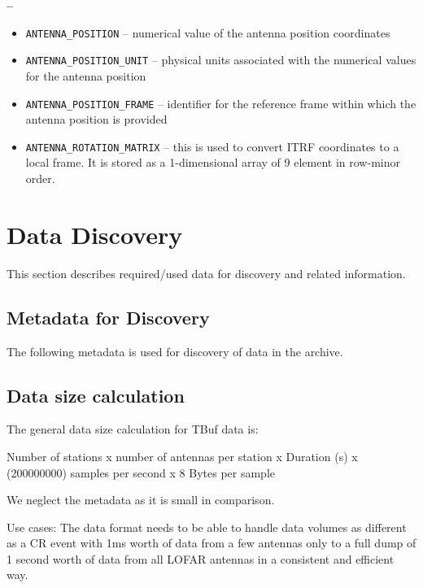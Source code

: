 \documentclass[a4paper,10pt,bibtotoc]{scrartcl}
\begin{document}
\begin{list}{\textbf{--}}{}
  \begin{itemize} \parskip 0pt
  \item \verb|ANTENNA_POSITION| -- numerical value of the antenna position
    coordinates
  \item \verb|ANTENNA_POSITION_UNIT| -- physical units associated with the numerical
    values for the antenna position
  \item \verb|ANTENNA_POSITION_FRAME| -- identifier for the reference frame within
    which the antenna position is provided
  \item \verb|ANTENNA_ROTATION_MATRIX| -- this is used to convert ITRF
    coordinates to a local frame. It is stored as a 1-dimensional array of 9
    element in row-minor order.
  \end{itemize}
\end{list}

\clearpage


\section{Data Discovery}
This section describes required/used data for discovery and related information.

\subsection{Metadata for Discovery}
The following metadata is used for discovery of data in the archive. %

\subsection{Data size calculation}

The general data size calculation for TBuf data is:

Number of stations x number of antennas per station x Duration (s) x (200000000) samples per second x 8 Bytes per sample

We neglect the metadata as it is small in comparison.


Use cases: The data format needs to be able to handle data volumes as different as a
CR event with 1ms worth of data from a few antennas only to a full dump of 1
second worth of data from all LOFAR antennas in a consistent and efficient way.
\end{document}
